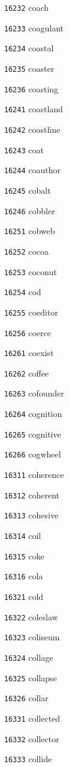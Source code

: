 \documentclass[twoside,11pt]{article}
\begin{document}
\begin{multicols}{5}
\begin{enumerate}
\item[\texttt{16232}] coach
\item[\texttt{16233}] coagulant
\item[\texttt{16234}] coastal
\item[\texttt{16235}] coaster
\item[\texttt{16236}] coasting
\item[\texttt{16241}] coastland
\item[\texttt{16242}] coastline
\item[\texttt{16243}] coat
\item[\texttt{16244}] coauthor
\item[\texttt{16245}] cobalt
\item[\texttt{16246}] cobbler
\item[\texttt{16251}] cobweb
\item[\texttt{16252}] cocoa
\item[\texttt{16253}] coconut
\item[\texttt{16254}] cod
\item[\texttt{16255}] coeditor
\item[\texttt{16256}] coerce
\item[\texttt{16261}] coexist
\item[\texttt{16262}] coffee
\item[\texttt{16263}] cofounder
\item[\texttt{16264}] cognition
\item[\texttt{16265}] cognitive
\item[\texttt{16266}] cogwheel
\item[\texttt{16311}] coherence
\item[\texttt{16312}] coherent
\item[\texttt{16313}] cohesive
\item[\texttt{16314}] coil
\item[\texttt{16315}] coke
\item[\texttt{16316}] cola
\item[\texttt{16321}] cold
\item[\texttt{16322}] coleslaw
\item[\texttt{16323}] coliseum
\item[\texttt{16324}] collage
\item[\texttt{16325}] collapse
\item[\texttt{16326}] collar
\item[\texttt{16331}] collected
\item[\texttt{16332}] collector
\item[\texttt{16333}] collide

\end{enumerate}
\end{multicols}
\end{document}
